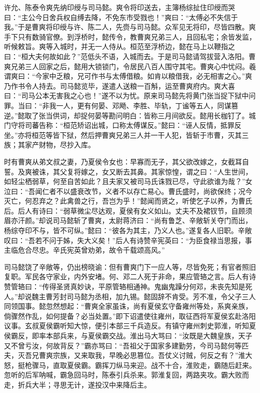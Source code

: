 许允、陈泰令爽先纳印绶与司马懿。爽令将印送去，主簿杨综扯住印绶而哭曰：“主公今日舍兵权自缚去降，不免东市受戮也！”爽曰：“太傅必不失信于我。”于是曹爽将印绶与许、陈二人，先赍与司马懿。众军见无将印，尽皆四散。爽手下只有数骑官僚。到浮桥时，懿传令，教曹爽兄弟三人，且回私宅；余皆发监，听候敕旨。爽等入城时，并无一人侍从。桓范至浮桥边，懿在马上以鞭指之曰：“桓大夫何故如此？”范低头不语，入城而去。于是司马懿请驾拔营入洛阳。曹爽兄弟三人回家之后，懿用大锁锁门，令居民八百人围守其宅。曹爽心中忧闷。羲谓爽曰：“今家中乏粮，兄可作书与太傅借粮。如肯以粮借我，必无相害之心。”爽乃作书令人持去。司马懿览毕，遂遣人送粮一百斛，运至曹爽府内。爽大喜曰：“司马公本无害我之心也！”遂不以为忧。原来司马懿先将黄门张当捉下狱中问罪。当曰：“非我一人，更有何晏、邓飏、李胜、毕轨，丁谧等五人，同谋篡逆。”懿取了张当供词，却捉何晏等勘问明白：皆称三月间欲反。懿用长枷钉了。城门守将司蕃告称：“桓范矫诏出城，口称太傅谋反。”懿曰：“诬人反情，抵罪反坐。”亦将桓范等皆下狱，然后押曹爽兄弟三人并一干人犯，皆斩于市曹，灭其三族；其家产财物，尽抄入库。

时有曹爽从弟文叔之妻，乃夏侯令女也：早寡而无子，其父欲改嫁之，女截耳自誓。及爽被诛，其父复将嫁之，女又断去其鼻。其家惊惶，谓之曰：“人生世间，如轻尘栖弱草，何至自苦如此？且夫家又被司马氏诛戮已尽，守此欲谁为哉？”女泣曰：“吾闻仁者不以盛衰改节，义者不以存亡易心。曹氏盛时，尚欲保终；况今灭亡，何忍弃之？此禽兽之行，吾岂为乎！”懿闻而贤之，听使乞子以养，为曹氏后。后人有诗曰：“弱草微尘尽达观，夏侯有女义如山。丈夫不及裙钗节，自顾须眉亦汗颜。”却说司马懿斩了曹爽，太尉蒋济曰：“尚有鲁芝、辛敞斩关夺门而出，杨综夺印不与，皆不可纵。”懿曰：“彼各为其主，乃义人也。”遂复各人旧职。辛敞叹曰：“吾若不问于姊，失大义矣！”后人有诗赞辛宪英曰：“为臣食禄当思报，事主临危合尽忠。辛氏宪英曾劝弟，故令千载颂高风。”

司马懿饶了辛敞等，仍出榜晓谕：但有曹爽门下一应人等，尽皆免死；有官者照旧复职。军民各守家业，内外安堵。何、邓二人死于非命，果应管辂之言。后人有诗赞管辂曰：“传得圣贤真妙诀，平原管辂相通神。鬼幽鬼躁分何邓，未丧先知是死人。”却说魏主曹芳封司马懿为丞相，加九锡。懿固辞不肯受。芳不准，令父子三人同领国事。懿忽然想起：“曹爽全家虽诛，尚有夏侯玄守备雍州等处，系爽亲族，倘骤然作乱，如何提备？必当处置。”即下诏遣使往雍州，取征西将军夏侯玄赴洛阳议事。玄叔夏侯霸听知大惊，便引本部三千兵造反。有镇守雍州刺史郭淮，听知夏侯霸反，即率本部兵来，与夏侯霸交战。淮出马大骂曰：“汝既是大魏皇族，天子又不曾亏汝，何故背反？”霸亦骂曰：“吾祖父于国家多建勤劳，今司马懿何等匹夫，灭吾兄曹爽宗族，又来取我，早晚必思篡位。吾仗义讨贼，何反之有？”淮大怒，挺枪骤马，直取夏侯霸。霸挥刀纵马来迎。战不十合，淮败走，霸随后赶来。忽听的后军呐喊，霸急回马时，陈泰引兵杀来。郭淮复回，两路夹攻。霸大败而走，折兵大半；寻思无计，遂投汉中来降后主。

